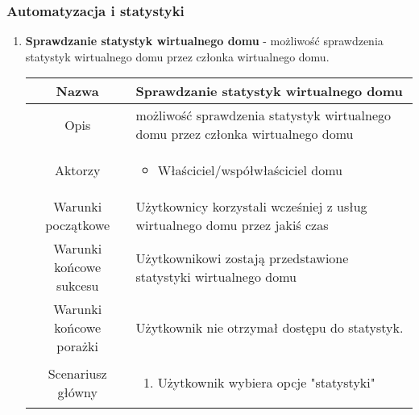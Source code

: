 \documentclass{article}
\begin{document}
\begin{enumerate}
		\subsubsection{Automatyzacja i statystyki}
		\begin{enumerate}
			\item \textbf{Sprawdzanie statystyk wirtualnego domu} - możliwość
				sprawdzenia statystyk wirtualnego domu przez członka wirtualnego domu.

				\begin{table}[H]
					\centering
					\begin{tabular}{|c|p{7cm}|}
						\hline
						Nazwa                   & \textbf{Sprawdzanie statystyk wirtualnego domu}                                                                                                                                                                                                                                               \\
						\hline
						Opis                    & możliwość sprawdzenia statystyk wirtualnego domu przez członka wirtualnego domu                                                                                                                                                                                                               \\
						\hline
						Aktorzy                 & \begin{itemize}\item Właściciel/współwłaściciel domu\end{itemize}                                                                                                                                                                                                                             \\
						\hline
						Warunki początkowe      & Użytkownicy korzystali wcześniej z usług wirtualnego domu przez jakiś czas                                                                                                                                                                                                                    \\
						\hline
						Warunki końcowe sukcesu & Użytkownikowi zostają przedstawione statystyki wirtualnego domu                                                                                                                                                                                                                               \\
						\hline
						Warunki końcowe porażki & Użytkownik nie otrzymał dostępu do statystyk.                                                                                                                                                                                                                                                 \\
						\hline
						Scenariusz główny       & \begin{enumerate}\item Użytkownik wybiera opcje "statystyki"


\end{enumerate}
\end{tabular}
\end{table}
\end{enumerate}
\end{enumerate}
\end{document}
